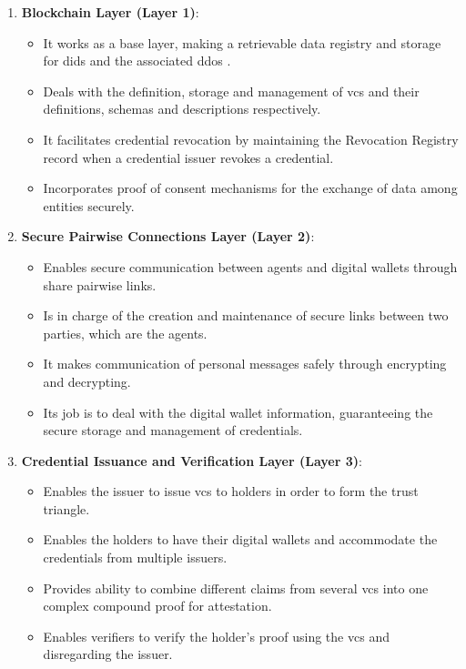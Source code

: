 \begin{enumerate}
  \item \textbf{Blockchain Layer (Layer 1)}:
  \begin{itemize}
    \item It works as a base layer, making a retrievable data registry and storage for \gls{did}s and the associated \gls{ddo}s \cite{DIDarchitecture}.
    \item Deals with the definition, storage and management of \gls{vc}s and their definitions, schemas and descriptions respectively.
    \item It facilitates credential revocation by maintaining the Revocation Registry record when a credential issuer revokes a credential.
    \item Incorporates proof of consent mechanisms for the exchange of data among entities securely.
  \end{itemize}
  
  \item \textbf{Secure Pairwise Connections Layer (Layer 2)}:
  \begin{itemize}
    \item Enables secure communication between agents and digital wallets through share pairwise links.
    \item Is in charge of the creation and maintenance of secure links between two parties, which are the agents.
    \item It makes communication of personal messages safely through encrypting and decrypting.
    \item Its job is to deal with the digital wallet information, guaranteeing the secure storage and management of credentials.
  \end{itemize}
  
  \item \textbf{Credential Issuance and Verification Layer (Layer 3)}:
  \begin{itemize}
    \item Enables the issuer to issue \gls{vc}s to holders in order to form the trust triangle.
    \item Enables the holders to have their digital wallets and accommodate the credentials from multiple issuers.
    \item Provides ability to combine different claims from several \gls{vc}s into one complex compound proof for attestation.
    \item Enables verifiers to verify the holder's proof using the \gls{vc}s and disregarding the issuer.
  \end{itemize}
  

\end{enumerate}
